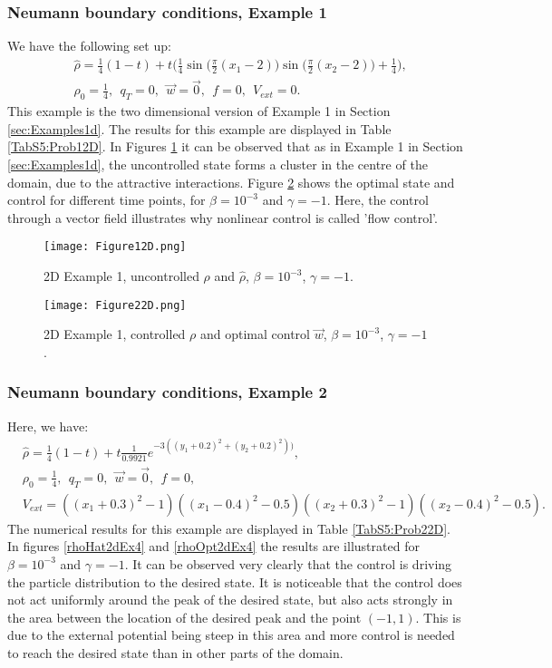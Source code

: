 \subsubsection{Neumann boundary conditions, Example 1}	
We have the following set up:
\begin{align*}
&\widehat \rho = \frac{1}{4}(1-t) + t\bigg(\frac{1}{4}\sin \bigg(\frac{\pi}{2}(x_1 - 2)\bigg)\sin \bigg(\frac{\pi}{2}(x_2 - 2)\bigg) + \frac{1}{4}\bigg),\\
&\rho_0 = \frac{1}{4},\ \
q_{T} = 0,\ \
\vec{w} = \vec{0},\ \
f =0,\ \
V_{ext} =0.
\end{align*}
This example is the two dimensional version of Example 1 in Section \ref{sec:Examples1d}. The results for this example are displayed in Table \ref{TabS5:Prob12D}. In Figures \ref{rhoHat2dEx2} it can be observed that as in Example 1 in Section \ref{sec:Examples1d}, the uncontrolled state forms a cluster in the centre of the domain, due to the attractive interactions. Figure \ref{rhoOpt2dEx2} shows the optimal state and control for different time points, for $\beta = 10^{-3}$ and $\gamma = -1$. Here, the control through a vector field illustrates why nonlinear control is called 'flow control'. 


\begin{figure}[h]
	\texttt{[image: Figure12D.png]}
	\caption{2D Example 1, uncontrolled $\rho$ and $\widehat \rho$, $\beta = 10^{-3}$, $\gamma = -1$.}
	\label{rhoHat2dEx2}
\end{figure}
\begin{figure}[h]
	\texttt{[image: Figure22D.png]}
	\caption{2D Example 1, controlled $\rho$ and optimal control $\vec{w}$, $\beta = 10^{-3}$, $\gamma = -1$.}
	\label{rhoOpt2dEx2}
\end{figure}


\subsubsection{Neumann boundary conditions, Example 2}	
Here, we have:
\begin{align*}
&\widehat \rho = \frac{1}{4}(1-t) + t\frac{1}{0.9921}e^{-3((y_1+0.2)^2 + (y_2+0.2)^2))},\\
&\rho_0 = \frac{1}{4},\ \
q_{T} = 0,\ \
\vec{w} = \vec{0},\ \
f =0,\\
&V_{ext} =\left((x_1 + 0.3)^2 - 1\right)\left((x_1-0.4)^2 - 0.5\right)
\left((x_2 + 0.3)^2 - 1\right)\left((x_2-0.4)^2 - 0.5\right).
\end{align*}
The numerical results for this example are displayed in Table \ref{TabS5:Prob22D}. In figures \ref{rhoHat2dEx4} and \ref{rhoOpt2dEx4} the results are illustrated for $\beta = 10^{-3}$ and $\gamma = -1$. It can be observed very clearly that the control is driving the particle distribution to the desired state. It is noticeable that the control does not act uniformly around the peak of the desired state, but also acts strongly in the area between the location of the desired peak and the point $(-1,1)$. This is due to the external potential being steep in this area and more control is needed to reach the desired state than in other parts of the domain.

